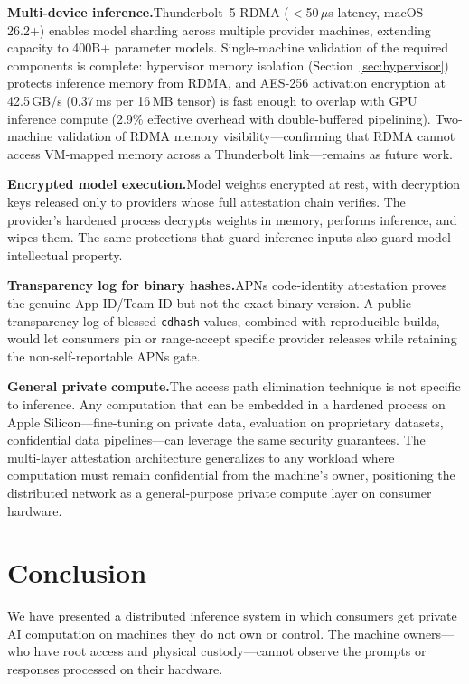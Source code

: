 \documentclass[10pt,twocolumn,letterpaper]{article}
\begin{document}
\textbf{Multi-device inference.}\quad Thunderbolt~5 RDMA ($<$50\,$\mu$s latency, macOS 26.2+) enables model sharding across multiple provider machines, extending capacity to 400B+ parameter models. Single-machine validation of the required components is complete: hypervisor memory isolation (Section~\ref{sec:hypervisor}) protects inference memory from RDMA, and AES-256 activation encryption at 42.5\,GB/s (0.37\,ms per 16\,MB tensor) is fast enough to overlap with GPU inference compute (2.9\% effective overhead with double-buffered pipelining). Two-machine validation of RDMA memory visibility---confirming that RDMA cannot access VM-mapped memory across a Thunderbolt link---remains as future work.

\textbf{Encrypted model execution.}\quad Model weights encrypted at rest, with decryption keys released only to providers whose full attestation chain verifies. The provider's hardened process decrypts weights in memory, performs inference, and wipes them. The same protections that guard inference inputs also guard model intellectual property.

\textbf{Transparency log for binary hashes.}\quad APNs code-identity attestation proves the genuine App ID/Team ID but not the exact binary version. A public transparency log of blessed \texttt{cdhash} values, combined with reproducible builds, would let consumers pin or range-accept specific provider releases while retaining the non-self-reportable APNs gate.

\textbf{General private compute.}\quad The access path elimination technique is not specific to inference. Any computation that can be embedded in a hardened process on Apple Silicon---fine-tuning on private data, evaluation on proprietary datasets, confidential data pipelines---can leverage the same security guarantees. The multi-layer attestation architecture generalizes to any workload where computation must remain confidential from the machine's owner, positioning the distributed network as a general-purpose private compute layer on consumer hardware.

\section{Conclusion}
\label{sec:conclusion}

We have presented a distributed inference system in which consumers get private AI computation on machines they do not own or control. The machine owners---who have root access and physical custody---cannot observe the prompts or responses processed on their hardware.
\end{document}
